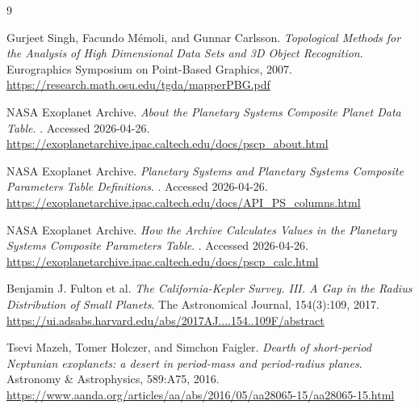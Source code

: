 \documentclass[11pt,letterpaper]{article}
\begin{document}
\newpage
\begin{thebibliography}{9}

Gurjeet Singh, Facundo M\'emoli, and Gunnar Carlsson.
\newblock \emph{Topological Methods for the Analysis of High Dimensional Data Sets and 3D Object Recognition}.
\newblock Eurographics Symposium on Point-Based Graphics, 2007.
\newblock \url{https://research.math.osu.edu/tgda/mapperPBG.pdf}

NASA Exoplanet Archive.
\newblock \emph{About the Planetary Systems Composite Planet Data Table}.
. Accessed 2026-04-26.
\newblock \url{https://exoplanetarchive.ipac.caltech.edu/docs/pscp_about.html}

NASA Exoplanet Archive.
\newblock \emph{Planetary Systems and Planetary Systems Composite Parameters Table Definitions}.
. Accessed 2026-04-26.
\newblock \url{https://exoplanetarchive.ipac.caltech.edu/docs/API_PS_columns.html}

NASA Exoplanet Archive.
\newblock \emph{How the Archive Calculates Values in the Planetary Systems Composite Parameters Table}.
. Accessed 2026-04-26.
\newblock \url{https://exoplanetarchive.ipac.caltech.edu/docs/pscp_calc.html}

Benjamin J. Fulton et al.
\newblock \emph{The California-Kepler Survey. III. A Gap in the Radius Distribution of Small Planets}.
\newblock The Astronomical Journal, 154(3):109, 2017.
\newblock \url{https://ui.adsabs.harvard.edu/abs/2017AJ....154..109F/abstract}

Tsevi Mazeh, Tomer Holczer, and Simchon Faigler.
\newblock \emph{Dearth of short-period Neptunian exoplanets: a desert in period-mass and period-radius planes}.
\newblock Astronomy \& Astrophysics, 589:A75, 2016.
\newblock \url{https://www.aanda.org/articles/aa/abs/2016/05/aa28065-15/aa28065-15.html}

\end{thebibliography}
\end{document}
